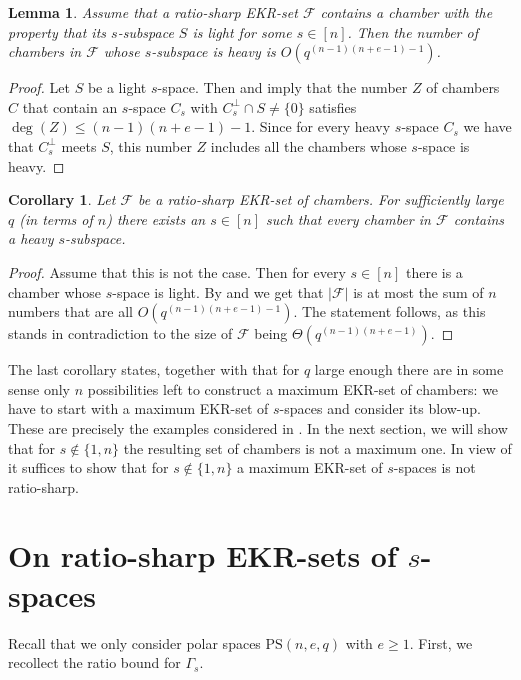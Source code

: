 \documentclass[11pt]{article}
\newtheorem{lemma}[thm]{Lemma}
\newtheorem{cor}[thm]{Corollary}
\newcommand{\EKR}{\mathcal{F}}
\newcommand{\PS}{\mathrm{PS}}
\renewcommand{\le}{\leqslant}
\renewcommand{\ge}{\geqslant}
\begin{document}
\begin{lemma} \label{L: heavy dimension}
	Assume that a ratio-sharp EKR-set $\EKR$ contains a chamber with the property that its $s$-subspace $S$ is light for some $s \in [n]$. 
    Then the number of chambers in $\EKR$ whose $s$-subspace is heavy is $O(q^{(n-1)(n+e-1)-1})$.
\end{lemma}
\begin{proof}
	Let $S$ be a light $s$-space. Then  and  imply that the number $Z$ of chambers $C$ that contain an $s$-space $C_s$ with $C_s^\perp \cap S \neq \{ 0\}$ satisfies $\deg(Z)\le (n-1)(n+e-1)-1$. Since for every heavy $s$-space $C_s$ we have that $C_s^\perp$ meets $S$, this number $Z$ includes all the chambers whose $s$-space is heavy. 
\end{proof}


\begin{cor} \label{C: chambers - blow-ups}
Let $\EKR$ be a ratio-sharp EKR-set of chambers. For sufficiently large $q$ (in terms of $n$) there exists an $s \in [n]$ such that every chamber in $\EKR$ contains a heavy $s$-subspace.
\end{cor}

\begin{proof}
	Assume that this is not the case. Then for every $s \in [n]$ there is a chamber whose $s$-space is light. By  and  we get that $|\EKR|$ is at most the sum of $n$ numbers that are all $O(q^{(n-1)(n+e-1)-1})$. The statement follows, as this stands in contradiction to the size of $\EKR$ being $\Theta(q^{(n-1)(n+e-1)})$. 
\end{proof}


The last corollary states, together with  that for $q$ large enough there are in some sense only $n$ possibilities left to construct a maximum EKR-set of chambers: we have to start with a maximum EKR-set of $s$-spaces and consider its blow-up. These are precisely the examples considered in . In the next section, we will show that for $s\notin \{1,n\}$ the resulting set of chambers is not a maximum one. In view of  it suffices to show that for $s\notin \{1,n\}$ a maximum EKR-set of $s$-spaces is not ratio-sharp.



\section{On ratio-sharp EKR-sets of $s$-spaces}\label{S:EKR_s-spaces}
Recall that we only consider polar spaces $\PS(n,e,q)$ with $e\ge 1$. First, we recollect the ratio bound for $\Gamma_s$. 
\end{document}

